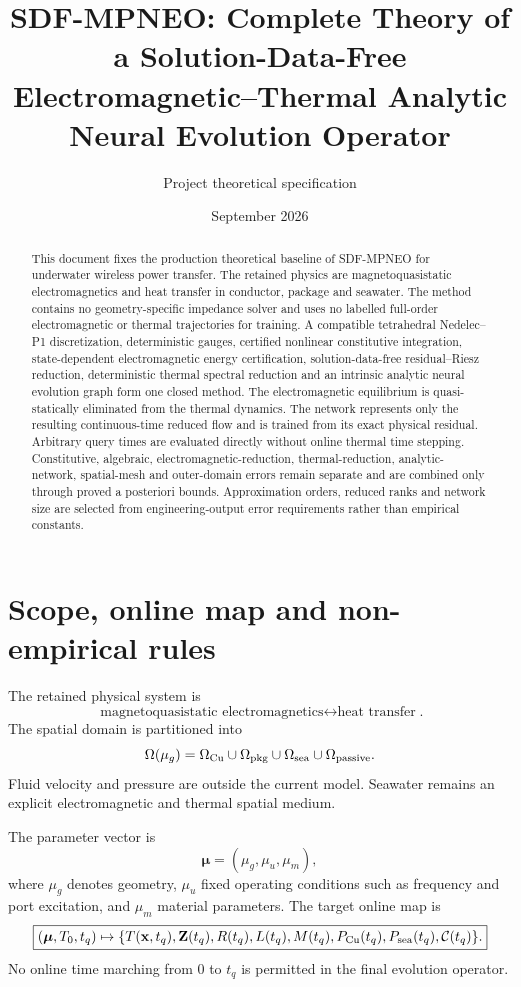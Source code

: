 \documentclass[11pt]{article}
\title{SDF-MPNEO: Complete Theory of a Solution-Data-Free\\
Electromagnetic--Thermal Analytic Neural Evolution Operator}
\author{Project theoretical specification}
\date{September 2026}
\theoremstyle{remark}
\newcommand{\mupar}{\boldsymbol\mu}
\begin{document}
\maketitle

\begin{abstract}
This document fixes the production theoretical baseline of SDF-MPNEO for underwater wireless power transfer. The retained physics are magnetoquasistatic electromagnetics and heat transfer in conductor, package and seawater. The method contains no geometry-specific impedance solver and uses no labelled full-order electromagnetic or thermal trajectories for training. A compatible tetrahedral Nedelec--P1 discretization, deterministic gauges, certified nonlinear constitutive integration, state-dependent electromagnetic energy certification, solution-data-free residual--Riesz reduction, deterministic thermal spectral reduction and an intrinsic analytic neural evolution graph form one closed method. The electromagnetic equilibrium is quasi-statically eliminated from the thermal dynamics. The network represents only the resulting continuous-time reduced flow and is trained from its exact physical residual. Arbitrary query times are evaluated directly without online thermal time stepping. Constitutive, algebraic, electromagnetic-reduction, thermal-reduction, analytic-network, spatial-mesh and outer-domain errors remain separate and are combined only through proved a posteriori bounds. Approximation orders, reduced ranks and network size are selected from engineering-output error requirements rather than empirical constants.
\end{abstract}

\tableofcontents

\section{Scope, online map and non-empirical rules}

The retained physical system is
\[
\boxed{\text{magnetoquasistatic electromagnetics}\longleftrightarrow\text{heat transfer}}.
\]
The spatial domain is partitioned into
\[
\Omega(\mu_g)=\Omega_{\rm Cu}\cup\Omega_{\rm pkg}\cup\Omega_{\rm sea}\cup\Omega_{\rm passive}.
\]
Fluid velocity and pressure are outside the current model. Seawater remains an explicit electromagnetic and thermal spatial medium.

The parameter vector is
\[
\mupar=(\mu_g,\mu_u,\mu_m),
\]
where \(\mu_g\) denotes geometry, \(\mu_u\) fixed operating conditions such as frequency and port excitation, and \(\mu_m\) material parameters. The target online map is
\begin{equation}
\boxed{
(\mupar,T_0,t_q)\mapsto
\{T(\mathbf x,t_q),\mathbf Z(t_q),R(t_q),L(t_q),M(t_q),P_{\rm Cu}(t_q),P_{\rm sea}(t_q),\mathcal C(t_q)\}.
}
\label{eq:online_map}
\end{equation}
No online time marching from \(0\) to \(t_q\) is permitted in the final evolution operator.
\end{document}
